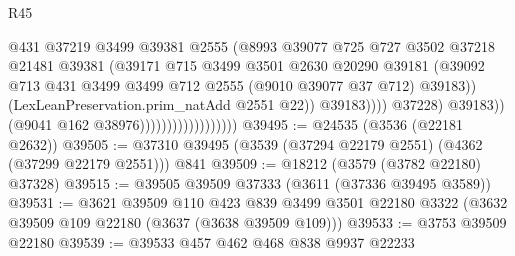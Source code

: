 \begin{lexlean}{R45}
\begin{coremodule}
                                                    @431
                                                    @37219
                                                    @3499
                                                    @39381
                                                    @2555
                                                    (@8993
                                                      @39077
                                                      @725
                                                      @727
                                                      @3502
                                                      @37218
                                                      @21481
                                                      @39381
                                                      (@39171
                                                        @715
                                                        @3499
                                                        @3501
                                                        @2630
                                                        @20290
                                                        @39181
                                                        (@39092
                                                          @713
                                                          @431
                                                          @3499
                                                          @3499
                                                          @712
                                                          @2555
                                                          (@9010 @39077 @37 @712)
                                                          @39183))
                                                      (LexLeanPreservation.prim_natAdd @2551 @22))
                                                    @39183))))
                                            @37228)
                                          @39183))
                                      (@9041 @162 @38976))))))))))))))))))
@39495 := @24535 (@3536 (@22181 @2632))
@39505 := @37310 @39495 (@3539 (@37294 @22179 @2551) (@4362 (@37299 @22179 @2551))) @841
@39509 := @18212 (@3579 (@3782 @22180) @37328)
@39515 := @39505 @39509 @37333 (@3611 (@37336 @39495 @3589))
@39531 := @3621
    @39509
    @110
    @423
    @839
    @3499
    @3501
    @22180
    @3322
    (@3632 @39509 @109 @22180 (@3637 (@3638 @39509 @109)))
@39533 := @3753 @39509 @22180
@39539 := @39533 @457 @462 @468 @838 @9937 @22233

\end{coremodule}
\end{lexlean}
